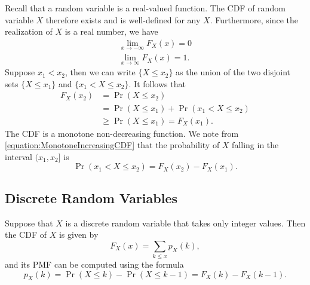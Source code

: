 Recall that a random variable is a real-valued function.
The CDF of random variable $X$ therefore exists and is well-defined for any $X$.
Furthermore, since the realization of $X$ is a real number, we have
\begin{gather*}
\lim_{x \rightarrow - \infty} F_X (x) = 0 \\
\lim_{x \rightarrow \infty} F_X (x) = 1.
\end{gather*}
Suppose $x_1 < x_2$, then we can write $\{ X \leq x_2 \}$ as the union of the two disjoint sets $\{ X \leq x_1 \}$ and $\{ x_1 < X \leq x_2 \}$.
It follows that
\begin{equation} \label{equation:MonotoneIncreasingCDF}
\begin{split}
F_X (x_2) &= \Pr (X \leq x_2) \\
&= \Pr (X \leq x_1) + \Pr (x_1 < X \leq x_2) \\
&\geq \Pr (X \leq x_1) = F_X (x_1).
\end{split}
\end{equation}
The CDF is a monotone non-decreasing function.
We note from \eqref{equation:MonotoneIncreasingCDF} that the probability of $X$ falling in the interval $(x_1, x_2]$ is
\begin{equation} \label{equation:IntervalCDF}
\Pr (x_1 < X \leq x_2) = F_X (x_2) - F_X (x_1).
\end{equation}

\subsection{Discrete Random Variables}

Suppose that $X$ is a discrete random variable that takes only integer values.
Then the CDF of $X$ is given by
\begin{equation*}
F_X (x) = \sum_{k \leq x} p_X (k),
\end{equation*}
and its PMF can be computed using the formula
\begin{equation*}
p_X (k) = \Pr ( X \leq k) - \Pr (X \leq k -1 ) = F_X (k) - F_X (k-1).
\end{equation*}

